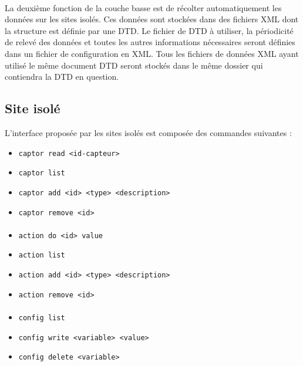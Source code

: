 \documentclass[a4paper, 11pt, final]{article}
\begin{document}
\paragraph{}
La deuxième fonction de la couche basse est de récolter automatiquement les données sur les sites isolés. Ces données sont stockées dans des fichiers XML dont la structure est définie par une DTD. Le fichier de DTD à utiliser, la périodicité de relevé des données et toutes les autres informations nécessaires seront définies dans un fichier de configuration en XML. Tous les fichiers de données XML ayant utilisé le même document DTD seront stockés dans le même dossier qui contiendra la DTD en question.

\subsection{Site isolé}
L'interface proposée par les sites isolés est composée des commandes suivantes :
\begin{itemize}
\item \texttt{captor read <id-capteur>}
\item \texttt{captor list}
\item \texttt{captor add <id> <type> <description>}
\item \texttt{captor remove <id>}
\end{itemize}

\paragraph{}
\begin{itemize}
\item \texttt{action do <id> value}
\item \texttt{action list}
\item \texttt{action add <id> <type> <description>}
\item \texttt{action remove <id>}
\end{itemize}

\paragraph{}
\begin{itemize}
\item \texttt{config list}
\item \texttt{config write <variable> <value>}
\item \texttt{config delete <variable>}
\end{itemize}
\end{document}
